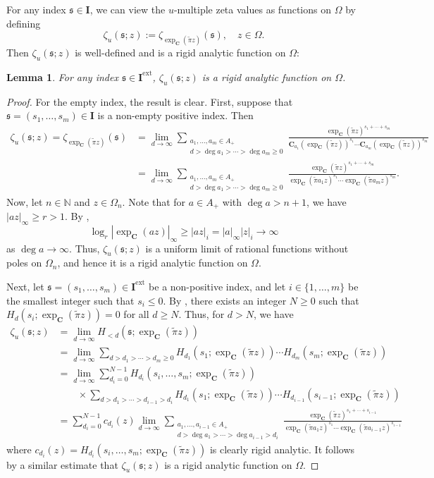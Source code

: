 \documentclass[12pt,reqno]{amsart}
\numberwithin{equation}{section}
\theoremstyle{plain}
\newtheorem{lem}[thm]{Lemma}
\theoremstyle{definition}
\theoremstyle{remark}
\newcommand{\NN}{\mathbb{N}}
\newcommand{\cpi}{\tilde{\pi}}
\newcommand{\ww}[1]{\mathfrak{#1}}
\newcommand{\C}{\mathbf{C}}
\newcommand{\Ical}{\mathbf{I}}
\newcommand{\ext}{\mathrm{ext}}
\begin{document}
For any index $\ww{s}\in\Ical$, we can view the $u$-multiple zeta values as functions on $\Omega$ by defining
\[
\zeta_u(\ww{s};z):=\zeta_{\exp_\C(\cpi z)}(\ww{s}),\quad z\in\Omega.
\]
Then $\zeta_u(\ww{s};z)$ is well-defined and is a rigid analytic function on $\Omega$:
\begin{lem}
    For any index $\ww{s}\in\Ical^{\ext}$, $\zeta_u(\ww{s};z)$ is a rigid analytic function on $\Omega$.
\end{lem}

\begin{proof}
    For the empty index, the result is clear. First, suppose that $\ww{s}=(s_1,\ldots,s_m)\in\Ical$ is a non-empty positive index. Then 
    \begin{align*}
        \zeta_u(\ww{s};z)=\zeta_{\exp_\C(\cpi z)}(\ww{s})&=\lim_{d\to\infty}\sum_{\substack{a_1,\ldots,a_m\in A_+\\d>\deg a_1>\cdots>\deg a_m\geq 0}}\frac{\exp_\C(\cpi z)^{s_1+\cdots+s_m}}{\C_{a_1}(\exp_\C(\cpi z))^{s_1}\cdots \C_{a_m}(\exp_\C(\cpi z))^{s_m}}\\
        &=\lim_{d\to\infty}\sum_{\substack{a_1,\ldots,a_m\in A_+\\d>\deg a_1>\cdots>\deg a_m\geq 0}}\frac{\exp_\C(\cpi z)^{s_1+\cdots+s_m}}{\exp_{\C}(\cpi a_1z)^{s_1}\cdots\exp_{\C}(\cpi a_mz)^{s_m}}.
    \end{align*}
    Now, let $n\in\NN$ and $z\in\Omega_n$. Note that for $a\in A_+$ with $\deg a>n+1$, we have $|az|_{\infty}\geq r>1$. By \cite[Lemma 5.5]{Gekeler1988}, 
    \[
    \log_r|\exp_\C(az)|_\infty\geq |az|_i=|a|_\infty|z|_i\to\infty
    \]
    as $\deg a\to\infty$. Thus, $\zeta_u(\ww{s};z)$ is a uniform limit of rational functions without poles on $\Omega_n$, and hence it is a rigid analytic function on $\Omega$.

    Next, let $\ww{s}=(s_1,\ldots,s_m)\in\Ical^{\ext}$ be a non-positive index, and let $i \in \{1, \ldots, m\}$ be the smallest integer such that $s_i\leq 0$. By \cite[Theorem 5.1.2]{Thakur2004}, there exists an integer $N\geq 0$ such that $H_d(s_i; \exp_\C(\cpi z))=0$ for all $d \geq N$. Thus, for $d>N$, we have
    \begin{align*}
        \zeta_u(\ww{s};z)&=\lim_{d\to\infty}H_{<d}(\ww{s};\exp_\C(\cpi z))\\
        &=\lim_{d\to\infty}\sum_{d>d_1>\cdots>d_m\geq 0}H_{d_1}(s_1;\exp_\C(\cpi z))\cdots H_{d_m}(s_m;\exp_\C(\cpi z))\\
        &=\lim_{d\to\infty}\sum_{d_i=0}^{N-1}H_{d_i}(s_i,\ldots,s_m;\exp_\C(\cpi z))\\
        &\qquad\times\sum_{d>d_1>\cdots>d_{i-1}>d_i}H_{d_1}(s_1;\exp_\C(\cpi z))\cdots H_{d_{i-1}}(s_{i-1};\exp_\C(\cpi z))\\
        &=\sum_{d_i=0}^{N-1}c_{d_i}(z)\lim_{d\to\infty}\sum_{\substack{a_1,\ldots,a_{i-1}\in A_+\\d>\deg a_1>\cdots>\deg a_{i-1}>d_i}}\frac{\exp_\C(\cpi z)^{s_1+\cdots+s_{i-1}}}{\exp_{\C}(\cpi a_1z)^{s_1}\cdots\exp_{\C}(\cpi a_{i-1}z)^{s_{i-1}}}
    \end{align*}
    where $c_{d_i}(z)=H_{d_i}(s_i,\ldots,s_m;\exp_\C(\cpi z))$ is clearly rigid analytic.
    It follows by a similar estimate that $\zeta_u(\ww{s};z)$ is a rigid analytic function on $\Omega$.
\end{proof}
\end{document}
